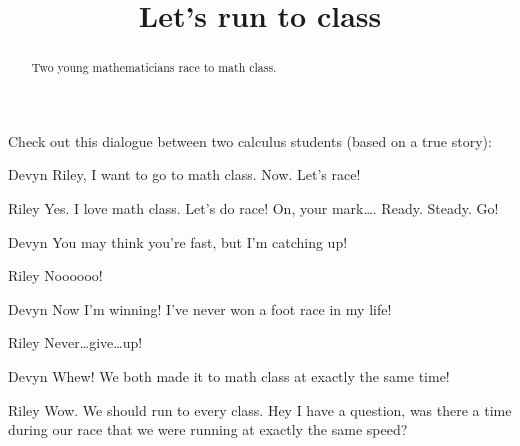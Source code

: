 \documentclass{ximera}
\title[Break-Ground:]{Let's run to class}
\begin{document}
\begin{abstract}
Two young mathematicians race to math class.
\end{abstract}
\maketitle

Check out this dialogue between two calculus students (based on a true
story):

\begin{dialogue}
\item[Devyn] Riley, I want to go to math class. Now. Let's race!
\item[Riley] Yes. I love math class. Let's do race! On, your
  mark\dots. Ready. Steady. Go!
\item[Devyn] You may think you're fast, but I'm catching up!
\item[Riley] Noooooo!
\item[Devyn] Now I'm winning! I've never won a foot race in my life!
\item[Riley] Never\dots give\dots up!
\item[Devyn] Whew! We both made it to math class at exactly the same
  time!
\item[Riley] Wow. We should run to every class. Hey I have a question,
  was there a time during our race that we were running at exactly the
  same speed?
\end{dialogue}

\begin{problem}
\end{problem}


\end{document}
